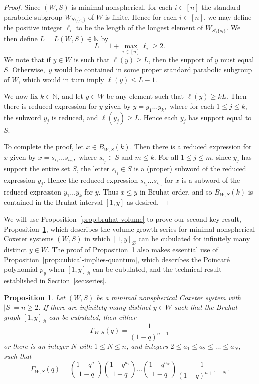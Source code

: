 \documentclass[11pt]{amsart}
\theoremstyle{plain}
\newtheorem{prop}[thm]{Proposition}
\theoremstyle{definition}
\newcommand{\N}{\mathbb{N}}
\newcommand{\cB}{\mathcal B}
\newcommand{\G}{\Gamma} %
\numberwithin{equation}{subsection}
\begin{document}
\begin{proof}
	Since $(W,S)$ is minimal nonspherical, for each $i \in [n]$ the standard parabolic subgroup $W_{S \setminus \{ s_i \}}$ of $W$ is finite. Hence for each $i \in [n]$, we may define the positive integer $\ell_i$ to be the length of the longest element of $W_{S \setminus \{ s_i \}}$.
	We then define $L=L(W,S) \in \N$ by
	\[
	L = 1 + \max_{i \in [n]} \ell_i \geq 2.
	\]
	We note that if $y \in W$ is such that $\ell(y) \geq L$, then the support of $y$ must equal $S$. Otherwise,~$y$ would be contained in some proper standard parabolic subgroup of $W$, which would in turn imply $\ell(y) \leq L - 1$.
	
We now fix $k \in \N$, and let $y \in W$ be any element such that $\ell(y) \geq k L$. Then there is reduced expression for $y$ given by $y = y_1 \dots y_k,$
where for each $1 \leq j \leq k$, the subword $y_j$ is reduced, and $\ell(y_j) \geq L$. Hence each $y_j$ has support equal to $S$.
	
To complete the proof, let $x \in B_{W,S}(k)$. Then there is a reduced expression for $x$ given by
$x = s_{i_1} \dots s_{i_m},$ where $s_{i_j} \in S$ and $m \leq k$.  For all $1 \leq j \leq m$, since $y_j$ has support the entire set $S$, the letter $s_{i_j} \in S$ is a (proper) subword of the reduced expression $y_j$. Hence the reduced expression $s_{i_1} \dots s_{i_m}$ for $x$ is a subword of the reduced expression $y_1 \dots y_k$ for $y$.	Thus $x \leq y$ in Bruhat order, and so $B_{W,S}(k)$ is contained in the Bruhat interval $[1,y]$ as desired.
\end{proof}

We will use Proposition~\ref{prop:bruhat-volume} to prove our second key result, Proposition~\ref{prop:growth-cubical}, which describes the volume growth series for minimal nonspherical Coxeter systems $(W,S)$ in which $[1,y]_\cB$ can be cubulated for infinitely many distinct $y \in W$. The proof of Proposition~\ref{prop:growth-cubical} also makes essential use of Proposition~\ref{prop:cubical-implies-quantum}, which describes the Poincar\'e polynomial $p_y$ when $[1,y]_\cB$ can be cubulated, and the technical result established in Section~\ref{sec:series}.

\begin{prop}\label{prop:growth-cubical}
	Let $(W,S)$ be a minimal nonspherical Coxeter system with $|S| = n \geq 2$. 
	If there are infinitely many distinct $y \in W$ such that the Bruhat graph $[1,y]_\cB$ can be cubulated, then either 
	\[
	\G_{W,S}(q) = \frac{1}{(1-q)^{n+1}}
	\]
	or there is an integer $N$ with $1 \leq N \leq n$, and  integers $2 \leq a_1 \leq a_2 \leq \dots \leq a_N$, such that 
	\[
	\Gamma_{W,S}(q)= 
	\left(
	\frac{1 - q^{a_1}}{1-q}
	\right)
	\left(
	\frac{1 - q^{a_2}}{1-q}
	\right)
	\dots
	\left(
	\frac{1 - q^{a_N}}{1-q}
	\right)
	\frac{1}{(1-q)^{n+1-N}}.
	\]
\end{prop}
\end{document}
